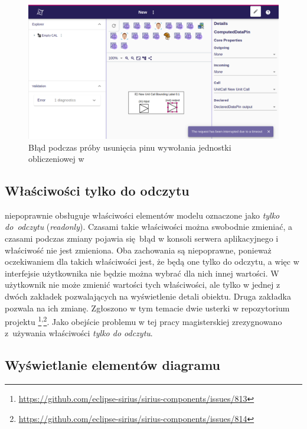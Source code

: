 \begin{figure}[!ht]
  \centering

  \includegraphics[width=0.95\linewidth]{./images/sirius-web-timeout-when-deleting-pins.png}
  \caption{Błąd podczas próby usunięcia pinu wywołania jednostki obliczeniowej w
    \SiriusWeb{}}\label{rys:sirius-web-timeout-when-deleting-pins}
\end{figure}

\subsection{Właściwości tylko do odczytu}

\SiriusWeb{} niepoprawnie obsługuje właściwości elementów modelu oznaczone
jako
\emph{tylko do~odczytu} (\emph{readonly}). Czasami takie właściwości można
swobodnie zmieniać, a czasami podczas zmiany pojawia się błąd w konsoli serwera
aplikacyjnego i właściwość nie jest zmieniona. Oba zachowania są niepoprawne,
ponieważ oczekiwaniem dla takich właściwości jest, że będą one tylko do
odczytu, a więc w interfejsie użytkownika nie będzie można wybrać dla nich
innej wartości. W \SiriusDesktop{} użytkownik nie może zmienić wartości
tych właściwości, ale tylko w jednej z dwóch zakładek pozwalających na
wyświetlenie detali obiektu. Druga zakładka pozwala na ich zmianę.
Zgłoszono w tym temacie dwie usterki w repozytorium
projektu \SiriusWeb{}\footnote{
	\url{https://github.com/eclipse-sirius/sirius-components/issues/813}
}\textsuperscript{,}\footnote{
	\url{https://github.com/eclipse-sirius/sirius-components/issues/814}
}. Jako obejście problemu w tej pracy magisterskiej zrezygnowano z~używania
właściwości \emph{tylko do odczytu}.

\subsection{Wyświetlanie elementów diagramu}

